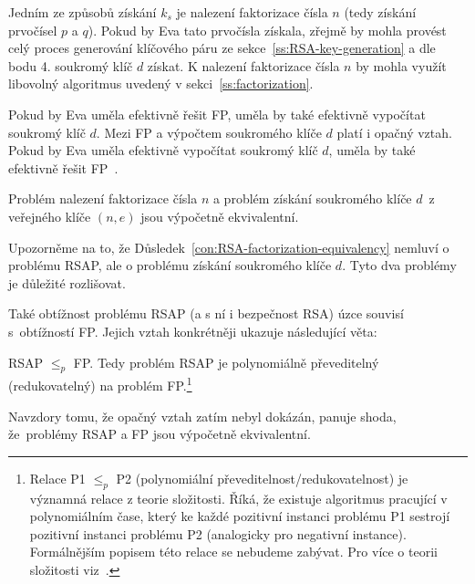 \documentclass[
  program=infoi,
  biblatex=false,
  figures=true,
  glossaries,
  tables=false,
  sourcecodes=true,
  index
]{kidiplom}
\begin{document}
        Jedním ze způsobů získání $k_s$ je nalezení faktorizace čísla $n$ (tedy získání prvočísel $p$ a $q$).
        Pokud by Eva tato prvočísla získala, zřejmě by mohla provést celý proces generování klíčového páru
        ze sekce~\ref{ss:RSA-key-generation} a dle bodu 4. soukromý klíč $d$ získat.
        K nalezení faktorizace čísla $n$ by mohla využít libovolný algoritmus uvedený v sekci~\ref{ss:factorization}.

        Pokud by Eva uměla efektivně řešit FP, uměla by také efektivně vypočítat soukromý klíč $d$.
        Mezi FP a výpočtem soukromého klíče $d$ platí i opačný vztah.
        Pokud by Eva uměla efektivně vypočítat soukromý klíč $d$, uměla by také efektivně řešit FP~\cite{handbook}.

        \begin{consequence}\label{con:RSA-factorization-equivalency}
            Problém nalezení faktorizace čísla $n$ a problém získání soukromého klíče $d$~z veřejného klíče $(n,e)$
            jsou výpočetně ekvivalentní.
        \end{consequence}

        \begin{remark}
            Upozorněme na to, že Důsledek~\ref{con:RSA-factorization-equivalency} nemluví o problému RSAP, ale o problému získání soukromého klíče $d$.
            Tyto dva problémy je důležité rozlišovat.
        \end{remark}

        Také obtížnost problému RSAP (a s ní i bezpečnost RSA) úzce souvisí s~obtížností FP.
        Jejich vztah konkrétněji ukazuje následující věta:

        \begin{theorem}
            RSAP $\leq_p$ FP. Tedy problém RSAP je polynomiálně převeditelný (redukovatelný) na problém FP.\footnote{Relace
            P1 $\leq_p$ P2 (polynomiální převeditelnost/redukovatelnost) je významná relace z teorie složitosti.
            Říká, že existuje algoritmus pracující v polynomiálním čase, který ke každé pozitivní instanci
            problému P1 sestrojí pozitivní instanci problému P2 (analogicky pro negativní instance).
            Formálnějším popisem této relace se nebudeme zabývat.
            Pro více o teorii složitosti viz~\cite{complexity}.}
        \end{theorem}

        \begin{remark}
            Navzdory tomu, že opačný vztah zatím nebyl dokázán, panuje shoda, že~problémy RSAP a FP jsou výpočetně ekvivalentní.
        \end{remark}
        
\end{document}
